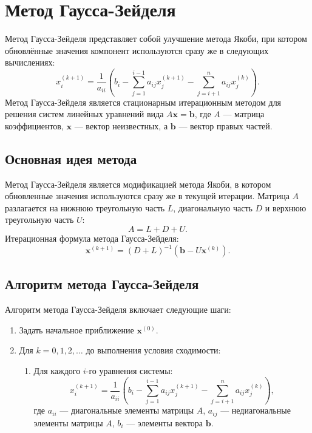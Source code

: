 \documentclass{article}
\begin{document}
\section{Метод Гаусса-Зейделя}
Метод Гаусса-Зейделя представляет собой улучшение метода Якоби, при котором обновлённые значения компонент используются сразу же в следующих вычислениях:
\[
x_i^{(k+1)} = \frac{1}{a_{ii}} \left( b_i - \sum_{j=1}^{i-1} a_{ij} x_j^{(k+1)} - \sum_{j=i+1}^{n} a_{ij} x_j^{(k)} \right).
\]
Метод Гаусса-Зейделя является стационарным итерационным методом для решения систем линейных уравнений вида \(A\mathbf{x} = \mathbf{b}\), где \(A\) — матрица коэффициентов, \(\mathbf{x}\) — вектор неизвестных, а \(\mathbf{b}\) — вектор правых частей.

\subsection*{Основная идея метода}

Метод Гаусса-Зейделя является модификацией метода Якоби, в котором обновленные значения используются сразу же в текущей итерации. Матрица \(A\) разлагается на нижнюю треугольную часть \(L\), диагональную часть \(D\) и верхнюю треугольную часть \(U\):
\[
A = L + D + U.
\]
Итерационная формула метода Гаусса-Зейделя:
\[
\mathbf{x}^{(k+1)} = (D + L)^{-1} (\mathbf{b} - U \mathbf{x}^{(k)}).
\]

\subsection*{Алгоритм метода Гаусса-Зейделя}

Алгоритм метода Гаусса-Зейделя включает следующие шаги:
\begin{enumerate}
    \item Задать начальное приближение \(\mathbf{x}^{(0)}\).
    \item Для \(k = 0, 1, 2, \ldots\) до выполнения условия сходимости:
    \begin{enumerate}
        \item Для каждого \(i\)-го уравнения системы:
        \[
        x_i^{(k+1)} = \frac{1}{a_{ii}} \left( b_i - \sum_{j=1}^{i-1} a_{ij} x_j^{(k+1)} - \sum_{j=i+1}^{n} a_{ij} x_j^{(k)} \right),
        \]
        где \(a_{ii}\) — диагональные элементы матрицы \(A\), \(a_{ij}\) — недиагональные элементы матрицы \(A\), \(b_i\) — элементы вектора \(\mathbf{b}\).
    \end{enumerate}
\end{enumerate}
\end{document}
